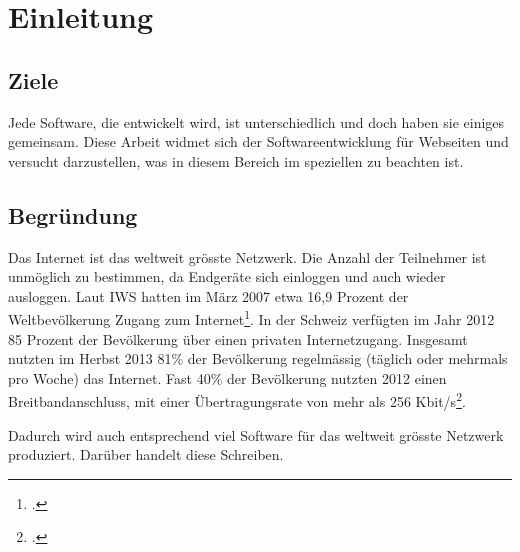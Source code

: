 \chapter{Einleitung}

\section{Ziele}
Jede Software, die entwickelt wird, ist unterschiedlich und doch haben sie einiges gemeinsam. Diese Arbeit widmet sich der Softwareentwicklung für Webseiten und versucht darzustellen, was in diesem Bereich im speziellen zu beachten ist.

\section{Begründung}
Das Internet ist das weltweit grösste Netzwerk. Die Anzahl der Teilnehmer ist unmöglich zu bestimmen, da Endgeräte sich einloggen und auch wieder ausloggen. Laut IWS hatten im März 2007 etwa 16,9 Prozent der Weltbevölkerung Zugang zum Internet\footcite{World_Internet_Users_Statistics2015-05-30}. In der Schweiz verfügten im Jahr 2012 85 Prozent der Bevölkerung über einen privaten Internetzugang. Insgesamt nutzten im Herbst 2013 81\% der Bevölkerung regelmässig (täglich oder mehrmals pro Woche) das Internet. Fast 40\% der Bevölkerung nutzten 2012 einen Breitbandanschluss, mit einer Übertragungsrate von mehr als 256 Kbit/s\footcite{Internet__Wikipedia_2015-05-30}.

Dadurch wird auch entsprechend viel Software für das weltweit grösste Netzwerk produziert. Darüber handelt diese Schreiben.
